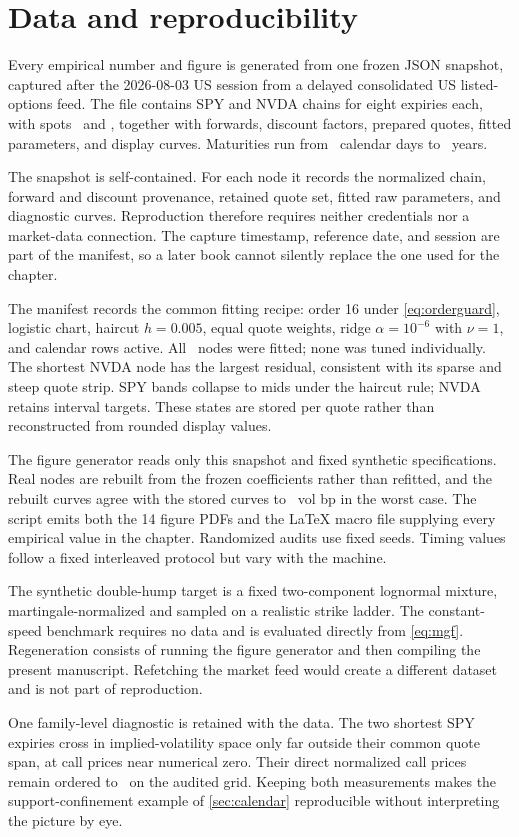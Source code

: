 \section{Data and reproducibility}
\label{app:data}

Every empirical number and figure is generated from one frozen JSON snapshot,
captured after the 2026-08-03 US session from a delayed consolidated US
listed-options feed.  The file contains SPY and NVDA chains for eight expiries
each, with spots \MacSpySpot\ and \MacNvdaSpot, together with forwards,
discount factors, prepared quotes, fitted parameters, and display curves.
Maturities run from \MacNvdaOneDayDays\ calendar days to
\MacNvdaLongTYears\ years.

The snapshot is self-contained.  For each node it records the normalized
chain, forward and discount provenance, retained quote set, fitted raw
parameters, and diagnostic curves.  Reproduction therefore requires neither
credentials nor a market-data connection.  The capture timestamp, reference
date, and session are part of the manifest, so a later book cannot silently
replace the one used for the chapter.

The manifest records the common fitting recipe: order 16 under
\eqref{eq:orderguard}, logistic chart, haircut $h=0.005$, equal quote weights,
ridge $\alpha=10^{-6}$ with $\nu=1$, and calendar rows active.  All
\MacSnapNodeCount\ nodes were fitted; none was tuned individually.
The shortest NVDA node has the largest residual, consistent with its sparse
and steep quote strip.  SPY bands collapse to mids under the haircut rule;
NVDA retains interval targets.  These states are stored per quote rather than
reconstructed from rounded display values.

The figure generator reads only this snapshot and fixed synthetic
specifications.  Real nodes are rebuilt from the frozen coefficients rather
than refitted, and the rebuilt curves agree with the stored curves to
\MacRebuildWorstBp\ vol bp in the worst case.  The script emits both the 14
figure PDFs and the LaTeX macro file supplying every empirical value in the
chapter.  Randomized audits use fixed seeds.  Timing values follow a fixed
interleaved protocol but vary with the machine.

The synthetic double-hump target is a fixed two-component lognormal mixture,
martingale-normalized and sampled on a realistic strike ladder.  The
constant-speed benchmark requires no data and is evaluated directly from
\eqref{eq:mgf}.  Regeneration consists of running the figure generator and
then compiling the present manuscript.  Refetching the market feed would
create a different dataset and is not part of reproduction.

One family-level diagnostic is retained with the data.  The two shortest SPY
expiries cross in implied-volatility space only far outside their common quote
span, at call prices near numerical zero.  Their direct normalized call prices
remain ordered to \MacCalPriceGridWorst\ on the audited grid.  Keeping both
measurements makes the support-confinement example of \cref{sec:calendar}
reproducible without interpreting the picture by eye.
